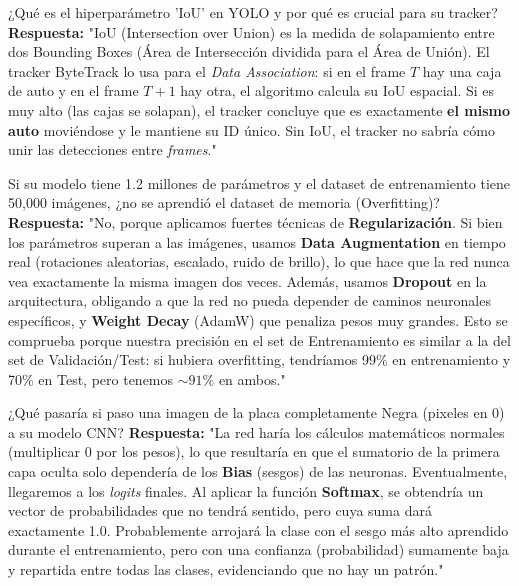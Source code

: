 \documentclass[11pt,a4paper]{article}
\begin{document}
\begin{pregunta}{¿Qu\'e es el hiperpar\'ametro 'IoU' en YOLO y por qu\'e es crucial para su tracker?}
    \textbf{Respuesta:} "IoU (Intersection over Union) es la medida de solapamiento entre dos Bounding Boxes (Área de Intersecci\'on dividida para el Área de Uni\'on). El tracker ByteTrack lo usa para el \emph{Data Association}: si en el frame $T$ hay una caja de auto y en el frame $T+1$ hay otra, el algoritmo calcula su IoU espacial. Si es muy alto (las cajas se solapan), el tracker concluye que es exactamente \textbf{el mismo auto} movi\'endose y le mantiene su ID único. Sin IoU, el tracker no sabr\'ia c\'omo unir las detecciones entre \emph{frames}."
\end{pregunta}

\begin{trampa}{Si su modelo tiene 1.2 millones de par\'ametros y el dataset de entrenamiento tiene 50,000 im\'agenes, ¿no se aprendi\'o el dataset de memoria (Overfitting)?}
    \textbf{Respuesta:} "No, porque aplicamos fuertes t\'ecnicas de \textbf{Regularizaci\'on}. Si bien los par\'ametros superan a las im\'agenes, usamos \textbf{Data Augmentation} en tiempo real (rotaciones aleatorias, escalado, ruido de brillo), lo que hace que la red nunca vea exactamente la misma imagen dos veces. Adem\'as, usamos \textbf{Dropout} en la arquitectura, obligando a que la red no pueda depender de caminos neuronales espec\'ificos, y \textbf{Weight Decay} (AdamW) que penaliza pesos muy grandes. Esto se comprueba porque nuestra precisi\'on en el set de Entrenamiento es similar a la del set de Validaci\'on/Test: si hubiera overfitting, tendr\'iamos 99\% en entrenamiento y 70\% en Test, pero tenemos $\sim 91\%$ en ambos."
\end{trampa}

\begin{pregunta}{¿Qu\'e pasar\'ia si paso una imagen de la placa completamente Negra (pixeles en 0) a su modelo CNN?}
    \textbf{Respuesta:} "La red har\'ia los c\'alculos matem\'aticos normales (multiplicar 0 por los pesos), lo que resultar\'ia en que el sumatorio de la primera capa oculta solo depender\'ia de los \textbf{Bias} (sesgos) de las neuronas. Eventualmente, llegaremos a los \emph{logits} finales. Al aplicar la funci\'on \textbf{Softmax}, se obtendr\'ia un vector de probabilidades que no tendr\'a sentido, pero cuya suma dar\'a exactamente 1.0. Probablemente arrojar\'a la clase con el sesgo m\'as alto aprendido durante el entrenamiento, pero con una confianza (probabilidad) sumamente baja y repartida entre todas las clases, evidenciando que no hay un patr\'on."
\end{pregunta}
\end{document}
